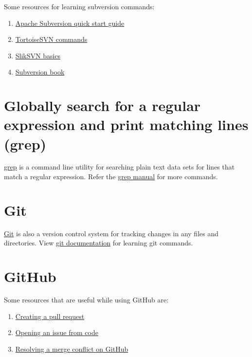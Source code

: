 \documentclass[
]{book}
\begin{document}
Some resources for learning subversion commands:

\begin{enumerate}
\def\labelenumi{\arabic{enumi}.}
\item
  \href{http://subversion.apache.org/quick-start}{Apache Subversion quick start guide}
\item
  \href{https://tortoisesvn.net/docs/nightly/TortoiseSVN_en/tsvn-cli-main.html}{TortoiseSVN commands}
\item
  \href{https://sliksvn.com/support/subversion-basics-using-check-out-update-check-in-commit/}{SlikSVN basics}
\item
  \href{http://svnbook.red-bean.com/}{Subversion book}
\end{enumerate}

\section{Globally search for a regular expression and print matching lines (grep)}\label{globally-search-for-a-regular-expression-and-print-matching-lines-grep}

\href{https://en.wikipedia.org/wiki/Grep}{grep} is a command line utility for searching plain text data sets for lines that match a regular expression. Refer the \href{https://www.gnu.org/software/grep/manual/grep.html}{grep manual} for more commands.

\section{Git}\label{git}

\href{https://en.wikipedia.org/wiki/Git}{Git} is also a version control system for tracking changes in any files and directories. View \href{https://git-scm.com/doc}{git documentation} for learning git commands.

\section{GitHub}\label{github}

Some resources that are useful while using GitHub are:

\begin{enumerate}
\def\labelenumi{\arabic{enumi}.}
\item
  \href{https://docs.github.com/en/github/collaborating-with-issues-and-pull-requests/creating-a-pull-request}{Creating a pull request}
\item
  \href{https://docs.github.com/en/github/managing-your-work-on-github/opening-an-issue-from-code}{Opening an issue from code}
\item
  \href{https://docs.github.com/en/github/collaborating-with-issues-and-pull-requests/resolving-a-merge-conflict-on-github}{Resolving a merge conflict on GitHub}
\end{enumerate}

  
\end{document}
